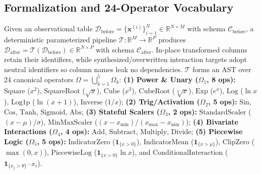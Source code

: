 \documentclass[sigconf]{acmart}
\begin{document}
\subsection{Formalization and 24-Operator Vocabulary}
Given an observational table $\mathcal{D}_{\text{before}} = \{\mathbf{x}^{(i)}\}_{i=1}^N \in \mathbb{R}^{N \times M}$ with schema $\mathcal{C}_{\text{before}}$, a deterministic parameterized pipeline $\mathcal{T}: \mathbb{R}^M \to \mathbb{R}^P$ produces $\mathcal{D}_{\text{after}} = \mathcal{T}(\mathcal{D}_{\text{before}}) \in \mathbb{R}^{N \times P}$ with schema $\mathcal{C}_{\text{after}}$. In-place transformed columns retain their identifiers, while synthesized/overwritten interaction targets adopt neutral identifiers so column names leak no dependencies. $\mathcal{T}$ forms an AST over 24 canonical operators $\Omega = \bigcup_{k=1}^5 \Omega_k$: \textbf{(1) Power \& Unary ($\Omega_1$, 8 ops):} $\text{Square}$ ($x^2$), $\text{SquareRoot}$ ($\sqrt{x}$), $\text{Cube}$ ($x^3$), $\text{CubeRoot}$ ($\sqrt[3]{x}$), $\text{Exp}$ ($e^x$), $\text{Log}$ ($\ln x$), $\text{Log1p}$ ($\ln(x+1)$), $\text{Inverse}$ ($1/x$); \textbf{(2) Trig/Activation ($\Omega_2$, 5 ops):} $\text{Sin}$, $\text{Cos}$, $\text{Tanh}$, $\text{Sigmoid}$, $\text{Abs}$; \textbf{(3) Stateful Scalers ($\Omega_3$, 2 ops):} $\text{StandardScaler}$ ($(x-\mu)/\sigma$), $\text{MinMaxScaler}$ ($(x-x_{\min})/(x_{\max}-x_{\min})$); \textbf{(4) Bivariate Interactions ($\Omega_4$, 4 ops):} $\text{Add}$, $\text{Subtract}$, $\text{Multiply}$, $\text{Divide}$; \textbf{(5) Piecewise Logic ($\Omega_5$, 5 ops):} $\text{IndicatorZero}$ ($\mathbf{1}_{\{x>0\}}$), $\text{IndicatorMean}$ ($\mathbf{1}_{\{x>\mu\}}$), $\text{ClipZero}$ ($\max(0,x)$), $\text{PiecewiseLog}$ ($\mathbf{1}_{\{x>0\}}\ln x$), and $\text{ConditionalInteraction}$ ($\mathbf{1}_{\{x_j>\theta\}}\cdot x_i$).
\end{document}
